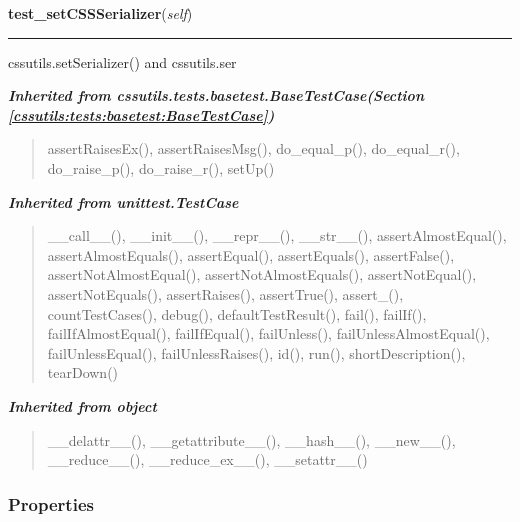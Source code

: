     \vspace{0.5ex}

\hspace{.8\funcindent}\begin{boxedminipage}{\funcwidth}

    \raggedright \textbf{test\_setCSSSerializer}(\textit{self})

    \vspace{-1.5ex}

    \rule{\textwidth}{0.5\fboxrule}
\setlength{\parskip}{2ex}
    cssutils.setSerializer() and cssutils.ser

\setlength{\parskip}{1ex}
    \end{boxedminipage}


\large{\textbf{\textit{Inherited from cssutils.tests.basetest.BaseTestCase\textit{(Section \ref{cssutils:tests:basetest:BaseTestCase})}}}}

\begin{quote}
assertRaisesEx(), assertRaisesMsg(), do\_equal\_p(), do\_equal\_r(), do\_raise\_p(), do\_raise\_r(), setUp()
\end{quote}

\large{\textbf{\textit{Inherited from unittest.TestCase}}}

\begin{quote}
\_\_call\_\_(), \_\_init\_\_(), \_\_repr\_\_(), \_\_str\_\_(), assertAlmostEqual(), assertAlmostEquals(), assertEqual(), assertEquals(), assertFalse(), assertNotAlmostEqual(), assertNotAlmostEquals(), assertNotEqual(), assertNotEquals(), assertRaises(), assertTrue(), assert\_(), countTestCases(), debug(), defaultTestResult(), fail(), failIf(), failIfAlmostEqual(), failIfEqual(), failUnless(), failUnlessAlmostEqual(), failUnlessEqual(), failUnlessRaises(), id(), run(), shortDescription(), tearDown()
\end{quote}

\large{\textbf{\textit{Inherited from object}}}

\begin{quote}
\_\_delattr\_\_(), \_\_getattribute\_\_(), \_\_hash\_\_(), \_\_new\_\_(), \_\_reduce\_\_(), \_\_reduce\_ex\_\_(), \_\_setattr\_\_()
\end{quote}


  \subsubsection{Properties}


